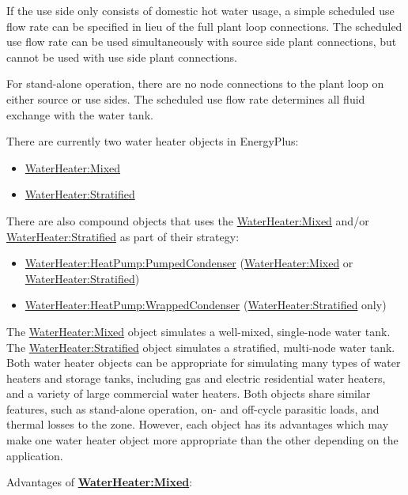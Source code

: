 If the use side only consists of domestic hot water usage, a simple scheduled use flow rate can be specified in lieu of the full plant loop connections. The scheduled use flow rate can be used simultaneously with source side plant connections, but cannot be used with use side plant connections.

For stand-alone operation, there are no node connections to the plant loop on either source or use sides. The scheduled use flow rate determines all fluid exchange with the water tank.

There are currently two water heater objects in EnergyPlus:

\begin{itemize}
\item
  \hyperref[waterheatermixed]{WaterHeater:Mixed}
\item
  \hyperref[waterheaterstratified]{WaterHeater:Stratified}
\end{itemize}

There are also compound objects that uses the \hyperref[waterheatermixed]{WaterHeater:Mixed} and/or \hyperref[waterheaterstratified]{WaterHeater:Stratified} as part of their strategy:

\begin{itemize}
\tightlist
\item
  \hyperref[waterheaterheatpumppumpedcondenser]{WaterHeater:HeatPump:PumpedCondenser} (\hyperref[waterheatermixed]{WaterHeater:Mixed} or \hyperref[waterheaterstratified]{WaterHeater:Stratified})
\item
  \hyperref[waterheaterheatpumpwrappedcondenser]{WaterHeater:HeatPump:WrappedCondenser} (\hyperref[waterheaterstratified]{WaterHeater:Stratified} only)
\end{itemize}

The \hyperref[waterheatermixed]{WaterHeater:Mixed} object simulates a well-mixed, single-node water tank. The \hyperref[waterheaterstratified]{WaterHeater:Stratified} object simulates a stratified, multi-node water tank. Both water heater objects can be appropriate for simulating many types of water heaters and storage tanks, including gas and electric residential water heaters, and a variety of large commercial water heaters. Both objects share similar features, such as stand-alone operation, on- and off-cycle parasitic loads, and thermal losses to the zone. However, each object has its advantages which may make one water heater object more appropriate than the other depending on the application.

Advantages of \textbf{\hyperref[waterheatermixed]{WaterHeater:Mixed}}:

